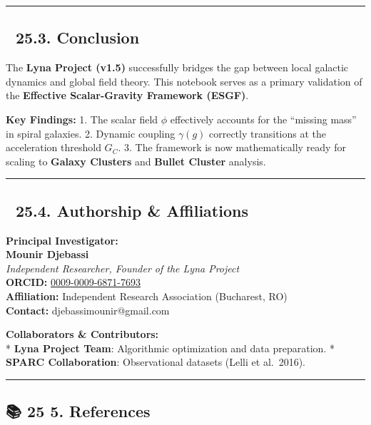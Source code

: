 \documentclass[
]{article}
\begin{document}
\begin{center}\rule{0.5\linewidth}{0.5pt}\end{center}

\subsection{🏁 25.3. Conclusion}\label{conclusion}

The \textbf{Lyna Project (v1.5)} successfully bridges the gap between
local galactic dynamics and global field theory. This notebook serves as
a primary validation of the \textbf{Effective Scalar-Gravity Framework
(ESGF)}.

\textbf{Key Findings:} 1. The scalar field \(\phi\) effectively accounts
for the ``missing mass'' in spiral galaxies. 2. Dynamic coupling
\(\gamma(g)\) correctly transitions at the acceleration threshold
\(G_C\). 3. The framework is now mathematically ready for scaling to
\textbf{Galaxy Clusters} and \textbf{Bullet Cluster} analysis.

\begin{center}\rule{0.5\linewidth}{0.5pt}\end{center}

\subsection{👤 25.4. Authorship \&
Affiliations}\label{authorship-affiliations}

\textbf{Principal Investigator:}\\
\textbf{Mounir Djebassi}\\
\emph{Independent Researcher, Founder of the Lyna Project}\\
\textbf{ORCID:} \href{https://orcid.org}{0009-0009-6871-7693}\\
\textbf{Affiliation:} Independent Research Association (Bucharest, RO)\\
\textbf{Contact:} djebassimounir@gmail.com

\textbf{Collaborators \& Contributors:}\\
* \textbf{Lyna Project Team}: Algorithmic optimization and data
preparation. * \textbf{SPARC Collaboration}: Observational datasets
(Lelli et al.~2016).

\begin{center}\rule{0.5\linewidth}{0.5pt}\end{center}

\subsection{📚 25 5. References}\label{references}
\end{document}
